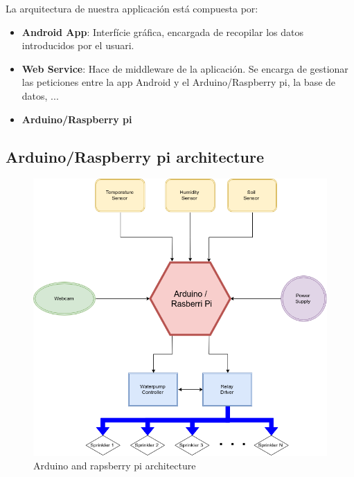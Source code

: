 \documentclass[11pt,a4paper]{article}
\begin{document}
La arquitectura de nuestra applicación está compuesta por:
\begin{itemize}
\item \textbf{Android App}: Interfície gráfica, encargada de recopilar los datos introducidos por el usuari.
\item \textbf{Web Service}: Hace de middleware de la aplicación. Se encarga de gestionar las peticiones entre la app Android y el Arduino/Raspberry pi, la base de datos, ...
\item \textbf{Arduino/Raspberry pi}
\end{itemize}

\newpage

\subsection{Arduino/Raspberry pi architecture}
\begin{figure}[hbtp]
\centering
\includegraphics[scale=0.6]{figures/ArduinoArch.png}
\caption{Arduino and rapsberry pi architecture}
\end{figure}

\newpage
\end{document}
